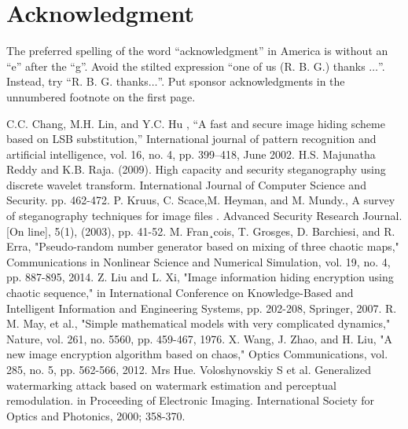 \documentclass[conference]{IEEEtran}
\begin{document}
\section*{Acknowledgment}

The preferred spelling of the word ``acknowledgment'' in America is without 
an ``e'' after the ``g''. Avoid the stilted expression ``one of us (R. B. 
G.) thanks $\ldots$''. Instead, try ``R. B. G. thanks$\ldots$''. Put sponsor 
acknowledgments in the unnumbered footnote on the first page.

\begin{thebibliography}{00}
 C.C.  Chang,  M.H.  Lin,  and  Y.C.  Hu  ,  “A  fast  and  secure  image hiding scheme based on LSB substitution,” International journal of pattern  recognition  and  artificial    intelligence,  vol.  16,  no.  4,  pp. 399–418, June 2002.
 H.S. Majunatha Reddy and K.B. Raja. (2009). High capacity and security steganography using discrete wavelet transform.  International Journal of Computer Science and Security. pp. 462-472.
 P. Kruus, C. Scace,M. Heyman, and M. Mundy., A survey of steganography techniques for image files . Advanced Security Research Journal. [On line], 5(1), (2003), pp. 41-52. 
 M. Fran¸cois, T. Grosges, D. Barchiesi, and R. Erra, "Pseudo-random number generator based on mixing of three chaotic maps," Communications in Nonlinear Science and Numerical Simulation, vol. 19, no. 4, pp. 887-895, 2014.
 Z. Liu and L. Xi, "Image information hiding encryption using chaotic sequence," in International Conference on Knowledge-Based and Intelligent Information and Engineering Systems, pp. 202-208, Springer, 2007.
 R. M. May, et al., "Simple mathematical models with very complicated dynamics," Nature, vol. 261, no. 5560, pp. 459-467, 1976.
 X. Wang, J. Zhao, and H. Liu, "A new image encryption algorithm based on chaos," Optics Communications, vol. 285, no. 5, pp. 562-566, 2012.
 Mrs Hue.
 Voloshynovskiy S et al. Generalized watermarking attack based on watermark estimation and perceptual remodulation. in Proceeding of Electronic Imaging. International Society for Optics and Photonics, 2000; 358-370.
\end{thebibliography}
\end{document}
